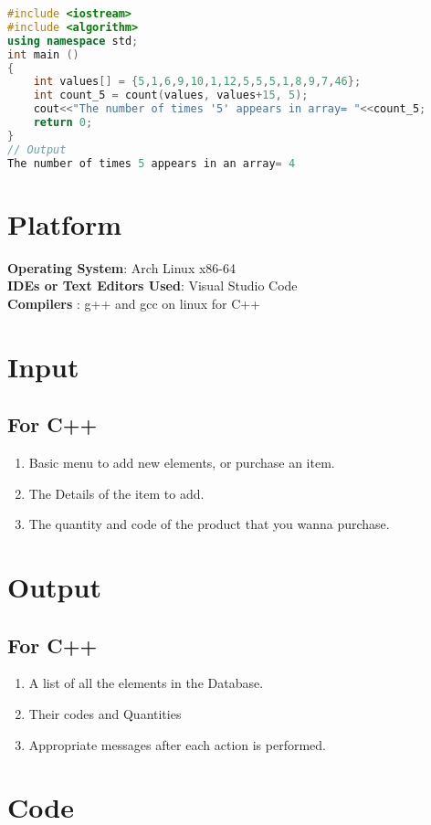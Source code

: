 \documentclass[11pt]{article}
\begin{document}
\begin{lstlisting}[language=C++]
#include <iostream>   
#include <algorithm>
using namespace std;
int main ()
{
	int values[] = {5,1,6,9,10,1,12,5,5,5,1,8,9,7,46};
	int count_5 = count(values, values+15, 5);
	cout<<"The number of times '5' appears in array= "<<count_5;
	return 0;
}
// Output
The number of times 5 appears in an array= 4	
\end{lstlisting}
\section{Platform}
\textbf{Operating System}: Arch Linux x86-64 \\
\textbf{IDEs or Text Editors Used}: Visual Studio Code\\
\textbf{Compilers} : g++ and gcc on linux for C++\\

\section{Input}

\subsection*{For C++}
\begin{enumerate}
	\item Basic menu to add new elements, or purchase an item.
	\item The Details of the item to add.
	\item The quantity and code of the product that you wanna purchase.
\end{enumerate}

\section{Output}
\subsection*{For C++}
\begin{enumerate}
	\item A list of all the elements in the Database.
	\item Their codes and Quantities
	\item Appropriate messages after each action is performed.
\end{enumerate}

\section{Code}
\end{document}
